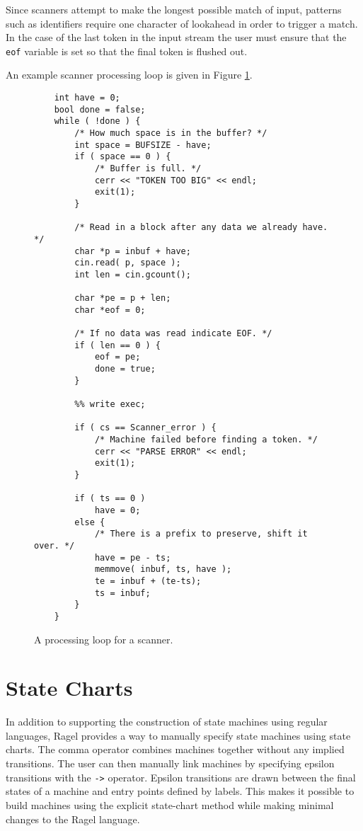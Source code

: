 \documentclass[letterpaper,11pt,oneside]{book}
\begin{document}
Since scanners attempt to make the longest possible match of input, patterns
such as identifiers require one character of lookahead in order to trigger a
match. In the case of the last token in the input stream the user must ensure
that the \verb|eof| variable is set so that the final token is flushed out.

An example scanner processing loop is given in Figure \ref{scanner-loop}.

\begin{figure}
\small
\begin{verbatim}
    int have = 0;
    bool done = false;
    while ( !done ) {
        /* How much space is in the buffer? */
        int space = BUFSIZE - have;
        if ( space == 0 ) {
            /* Buffer is full. */
            cerr << "TOKEN TOO BIG" << endl;
            exit(1);
        }

        /* Read in a block after any data we already have. */
        char *p = inbuf + have;
        cin.read( p, space );
        int len = cin.gcount();

        char *pe = p + len;
        char *eof = 0;

        /* If no data was read indicate EOF. */
        if ( len == 0 ) {
            eof = pe;
            done = true;
        }

        %% write exec;

        if ( cs == Scanner_error ) {
            /* Machine failed before finding a token. */
            cerr << "PARSE ERROR" << endl;
            exit(1);
        }

        if ( ts == 0 )
            have = 0;
        else {
            /* There is a prefix to preserve, shift it over. */
            have = pe - ts;
            memmove( inbuf, ts, have );
            te = inbuf + (te-ts);
            ts = inbuf;
        }
    }
\end{verbatim}
\caption{A processing loop for a scanner.
}
\label{scanner-loop}
\end{figure}

\section{State Charts}
\label{state-charts}

In addition to supporting the construction of state machines using regular
languages, Ragel provides a way to manually specify state machines using
state charts.  The comma operator combines machines together without any
implied transitions. The user can then manually link machines by specifying
epsilon transitions with the \verb|->| operator.  Epsilon transitions are drawn
between the final states of a machine and entry points defined by labels.  This
makes it possible to build machines using the explicit state-chart method while
making minimal changes to the Ragel language. 
\end{document}
